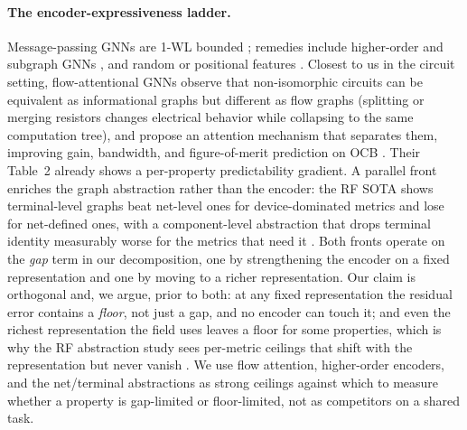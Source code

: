 \documentclass[10pt]{article}
\begin{document}
\paragraph{The encoder-expressiveness ladder.}
Message-passing GNNs are 1-WL bounded \citep{xu2019gin,morris2019wl}; remedies include higher-order and subgraph GNNs \citep{morris2019wl,bevilacqua2022esan}, and random or positional features \citep{sato2021random,loukas2020cannotlearn}. Closest to us in the circuit setting, flow-attentional GNNs observe that non-isomorphic circuits can be equivalent as informational graphs but different as flow graphs (splitting or merging resistors changes electrical behavior while collapsing to the same computation tree), and propose an attention mechanism that separates them, improving gain, bandwidth, and figure-of-merit prediction on OCB \citep{plettenberg2025flow}. Their Table~2 already shows a per-property predictability gradient. A parallel front enriches the graph abstraction rather than the encoder: the RF SOTA shows terminal-level graphs beat net-level ones for device-dominated metrics and lose for net-defined ones, with a component-level abstraction that drops terminal identity measurably worse for the metrics that need it \citep{asadi2025rfinformed}. Both fronts operate on the \emph{gap} term in our decomposition, one by strengthening the encoder on a fixed representation and one by moving to a richer representation. Our claim is orthogonal and, we argue, prior to both: at any fixed representation the residual error contains a \emph{floor}, not just a gap, and no encoder can touch it; and even the richest representation the field uses leaves a floor for some properties, which is why the RF abstraction study sees per-metric ceilings that shift with the representation but never vanish \citep{asadi2025rfinformed}. We use flow attention, higher-order encoders, and the net/terminal abstractions as strong ceilings against which to measure whether a property is gap-limited or floor-limited, not as competitors on a shared task.
\end{document}
